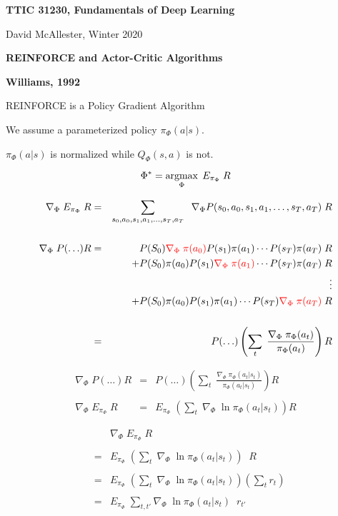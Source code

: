 




{\Huge

  \centerline{\bf TTIC 31230, Fundamentals of Deep Learning}
  \bigskip
  \centerline{David McAllester, Winter 2020}
  \vfill
  \centerline{\bf REINFORCE and Actor-Critic Algorithms}
  \vfill
  \vfill  



\centerline{\bf Williams, 1992}

\vfill
REINFORCE is a Policy Gradient Algorithm

\vfill
We assume a parameterized policy $\pi_\Phi(a|s)$.

\vfill
$\pi_\Phi(a|s)$ is normalized while $Q_\Phi(s,a)$ is not.


$$\Phi^* = \operatorname*{argmax}_\Phi\; E_{\pi_\Phi} \; R$$

{\huge
\begin{eqnarray*}
  \nabla_\Phi \;E_{\pi_\Phi}\;R & = & \sum_{s_0,a_0,s_1,a_1,\ldots,s_T,a_T}\;\;\nabla_\Phi P(s_0,a_0,s_1,a_1,\ldots,s_T,a_T)\;R \\
  \\
  \nabla_\Phi \;P(\ldots)R & = & P(S_0){\color{red} \nabla_\Phi \;\pi(a_0)}P(s_1)\pi(a_1) \cdots P(s_T)\pi(a_T)\;R \\
  & & + P(S_0)\pi(a_0)P(s_1){\color{red} \nabla_\Phi\;\pi(a_1)} \cdots P(s_T)\pi(a_T)\;R \\
  & & \vdots \\
  & & + P(S_0)\pi(a_0)P(s_1)\pi(a_1) \cdots P(s_T){\color{red} \nabla_\Phi\;\pi(a_T)}\;R \\
  \\
  & = & P(\ldots) \left(\sum_t\;\frac{\nabla_\Phi\;\pi_\Phi(a_t)}{\pi_\Phi(a_t)}\right) R
\end{eqnarray*}
}


\begin{eqnarray*}
  \nabla_\Phi \;P(\ldots)R  & = & P(\ldots) \left(\sum_t\;\frac{\nabla_\Phi\;\pi_\Phi(a_t|s_t)}{\pi_\Phi(a_t|s_t)}\right) R \\
  \\
  \nabla_\Phi \;E_{\pi_\Phi}\;R & = & E_{\pi_\Phi}\;\left(\sum_t\;\nabla_\Phi\;\ln \pi_\Phi(a_t|s_t)\right) R
\end{eqnarray*}

\begin{eqnarray*}
 & &   \nabla_\Phi \; E_{\pi_\Phi}\; R \\
  \\
  & = & E_{\pi_\Phi}\;\left(\sum_t\;\nabla_\Phi\;\ln \pi_\Phi(a_t|s_t)\right)\;\;R \\
  \\
  & = & E_{\pi_\Phi}\; \left(\sum_t\;\nabla_\Phi\;\ln \pi_\Phi(a_t|s_t)\right)\left(\sum_{t} r_{t}\right)  \\
  \\
  & = & E_{\pi_\Phi}\; \sum_{t,t'} \nabla_\Phi\;\ln \pi_\Phi(a_{t}|s_{t}) \;\;r_{t'}
\end{eqnarray*}


}
